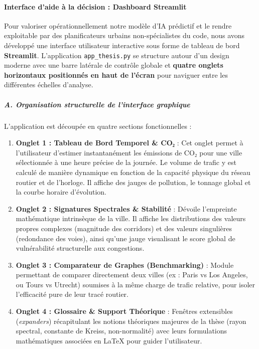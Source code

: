 \documentclass[10pt, a4paper]{article}
\providecommand{\tightlist}{}
\begin{document}
\paragraph{Interface d'aide à la décision : Dashboard
Streamlit}\label{interface-daide-uxe0-la-duxe9cision-dashboard-streamlit}

Pour valoriser opérationnellement notre modèle d'IA prédictif et le
rendre exploitable par des planificateurs urbains non-spécialistes du
code, nous avons développé une interface utilisateur interactive sous
forme de tableau de bord \textbf{Streamlit}. L'application
\texttt{app\_thesis.py} se structure autour d'un design moderne avec une
barre latérale de contrôle globale et \textbf{quatre onglets horizontaux
positionnés en haut de l'écran} pour naviguer entre les différentes
échelles d'analyse.

\subparagraph{A. Organisation structurelle de l'interface
graphique}\label{a.-organisation-structurelle-de-linterface-graphique}

L'application est découpée en quatre sections fonctionnelles :

\begin{enumerate}
\def\labelenumi{\arabic{enumi}.}
\tightlist
\item
  \textbf{Onglet 1 : Tableau de Bord Temporel \& CO₂} : Cet onglet
  permet à l'utilisateur d'estimer instantanément les émissions de CO₂
  pour une ville sélectionnée à une heure précise de la journée. Le
  volume de trafic y est calculé de manière dynamique en fonction de la
  capacité physique du réseau routier et de l'horloge. Il affiche des
  jauges de pollution, le tonnage global et la courbe horaire
  d'évolution.
\item
  \textbf{Onglet 2 : Signatures Spectrales \& Stabilité} : Dévoile
  l'empreinte mathématique intrinsèque de la ville. Il affiche les
  distributions des valeurs propres complexes (magnitude des corridors)
  et des valeurs singulières (redondance des voies), ainsi qu'une jauge
  visualisant le score global de vulnérabilité structurelle aux
  congestions.
\item
  \textbf{Onglet 3 : Comparateur de Graphes (Benchmarking)} : Module
  permettant de comparer directement deux villes (ex : Paris vs Los
  Angeles, ou Tours vs Utrecht) soumises à la même charge de trafic
  relative, pour isoler l'efficacité pure de leur tracé routier.
\item
  \textbf{Onglet 4 : Glossaire \& Support Théorique} : Fenêtres
  extensibles (\emph{expanders}) récapitulant les notions théoriques
  majeures de la thèse (rayon spectral, constante de Kreiss,
  non-normalité) avec leurs formulations mathématiques associées en
  LaTeX pour guider l'utilisateur.
\end{enumerate}
\end{document}
